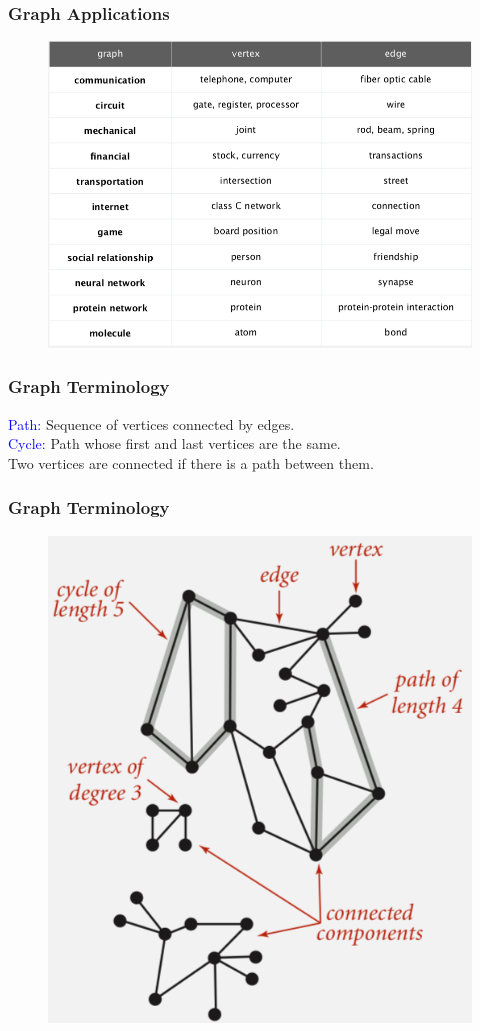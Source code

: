 \documentclass[11pt]{beamer}
\begin{document}
  \begin{frame}
	\frametitle	{Graph Applications} 
	\begin{figure}
		\centering
		\includegraphics[width=0.9\linewidth]{"Screenshot 2020-11-30 at 9.00.32 PM"}
		\label{fig:screenshot-2020-11-30-at-9}
	\end{figure}		
\end{frame}

  \begin{frame}
	\frametitle	{Graph Terminology} 
	\textcolor{blue}{Path: } Sequence of vertices connected by edges. \\
	\textcolor{blue}{Cycle: } Path whose first and last vertices are the same.\\
	Two vertices are \alert{connected} if there is a path between them.	
		
\end{frame}

  \begin{frame}
	\frametitle	{Graph Terminology} 
	\begin{figure}
		\centering
		\includegraphics[width=0.6\linewidth]{"Screenshot 2020-11-30 at 9.04.08 PM"}
		\caption{}
		\label{fig:screenshot-2020-11-30-at-9}
	\end{figure}	
\end{frame}
\end{document}
